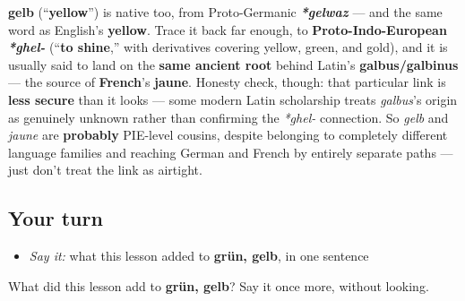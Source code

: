 \begin{cousinweb}
\textbf{gelb} (\textquotedblleft{}\textbf{yellow}\textquotedblright{}) is native too, from Proto-Germanic \emph{\textbf{*gelwaz}} — and the same word as English's \textbf{yellow}. Trace it back far enough, to \textbf{Proto-Indo-European} \emph{\textbf{*ghel-}} (\textquotedblleft{}\textbf{to shine},\textquotedblright{} with derivatives covering yellow, green, and gold), and it is usually said to land on the \textbf{same ancient root} behind Latin's \textbf{galbus/galbinus} — the source of \textbf{French}'s \textbf{jaune}. Honesty check, though: that particular link is \textbf{less secure} than it looks — some modern Latin scholarship treats \emph{galbus}'s origin as genuinely unknown rather than confirming the \emph{*ghel-} connection. So \emph{gelb} and \emph{jaune} are \textbf{probably} PIE-level cousins, despite belonging to completely different language families and reaching German and French by entirely separate paths — just don't treat the link as airtight.
\end{cousinweb}

\subsection*{Your turn}
\begin{itemize}
\raggedright
  \item \emph{Say it:} what this lesson added to \textbf{grün, gelb}, in one sentence
\end{itemize}

\begin{tcolorbox}[breakable,colback=teal!4,colframe=teal!35!black,title={Before you move on}]
What did this lesson add to \textbf{grün, gelb}? Say it once more, without looking.
\end{tcolorbox}
